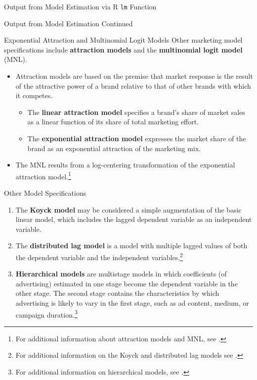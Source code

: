 \documentclass[pdf]{beamer}
\newcommand{\empr}[1]{{\color{franklinblue}\textbf{#1}}}
\theoremstyle{remark}
\theoremstyle{definition}
\begin{document}
\begin{frame}[t]{Output from Model Estimation via \textsf{R} \texttt{lm} Function}
\small

\end{frame}

\begin{frame}[t]{Output from Model Estimation Continued}
\small

\end{frame}

\begin{frame}[t]{Exponential Attraction and Multinomial Logit Models}
Other marketing model specifications include \empr{attraction models} and the \empr{multinomial logit model} (MNL).  \\
\vspace{1.5ex}
    \begin{itemize} 
      \item Attraction models are based on the premise that market response is the result of the  attractive power of a brand relative to that of other brands with which it competes.
      \small
      \begin{itemize} 
      \item The \empr{linear attraction model} specifies a brand's share of market sales as a linear function of its share of total marketing effort. 
      \item The \empr{exponential attraction model} expresses the market share of the brand as an exponential attraction of the marketing mix.
      \end{itemize}
      \normalsize
    \item The MNL results from a log-centering transformation of the exponential attraction model.\footnote{For additional information about attraction models and MNL, see \cite{cooper1988}.}
  \end{itemize}
\end{frame}

\begin{frame}[t]{Other Model Specifications}
\small
    \begin{enumerate}
      \item The \empr{Koyck model} may be considered a simple augmentation of the basic linear model, which includes the lagged dependent variable as an independent variable.
      \item The \empr{distributed lag model} is a model with multiple lagged values of both the dependent variable and the independent variables.\footnote{For additional information on the Koyck and distributed lag models see \cite{johnston1997}.}
      \item \empr{Hierarchical models} are multistage models in which coefficients (of advertising) estimated in one stage become the dependent variable in the other stage. The second stage contains the characteristics by which advertising is likely to vary in the first stage, such as ad content, medium, or campaign duration.\footnote{For additional information on hierarchical models, see \cite{tellis2000}.}
    \end{enumerate}
\end{frame}
\end{document}
